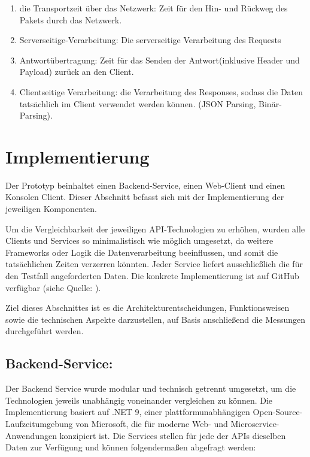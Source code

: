 \begin{enumerate}
	\item die Transportzeit über das Netzwerk:
	Zeit für den Hin- und Rückweg des Pakets durch das Netzwerk.
	
	\item Serverseitige-Verarbeitung:
	Die serverseitige Verarbeitung des Requests
	
	\item Antwortübertragung:
	Zeit für das Senden der Antwort(inklusive Header und Payload) zurück an den Client.
	
	\item Clientseitige Verarbeitung:
	die Verarbeitung des Responses, sodass die Daten tatsächlich im Client verwendet werden können. (JSON Parsing, Binär-Parsing).
	
\end{enumerate}

\clearpage
\section{Implementierung}
Der Prototyp beinhaltet einen Backend-Service, einen Web-Client und einen Konsolen Client. Dieser Abschnitt befasst sich mit der Implementierung der jeweiligen Komponenten. 

Um die Vergleichbarkeit der jeweiligen API-Technologien zu erhöhen, wurden alle Clients und Services so minimalistisch wie möglich umgesetzt, da weitere Frameworks oder Logik die Datenverarbeitung beeinflussen, und somit die tatsächlichen Zeiten verzerren könnten.
Jeder Service liefert ausschließlich die für den Testfall angeforderten Daten. 
Die konkrete Implementierung ist auf GitHub verfügbar (siehe Quelle: \cite{muehlberger2025}).


Ziel dieses Abschnittes ist es die Architekturentscheidungen, Funktionsweisen sowie die technischen Aspekte darzustellen, auf Basis anschließend die Messungen durchgeführt werden.

\subsection{Backend-Service:}

Der Backend Service wurde modular und technisch getrennt umgesetzt, um die Technologien jeweils unabhängig voneinander vergleichen zu können. Die Implementierung basiert auf .NET 9, einer plattformunabhängigen Open-Source-Laufzeitumgebung von Microsoft, die für moderne Web- und Microservice-Anwendungen konzipiert ist.
Die Services stellen für jede der APIs dieselben Daten zur Verfügung und können folgendermaßen abgefragt werden:

